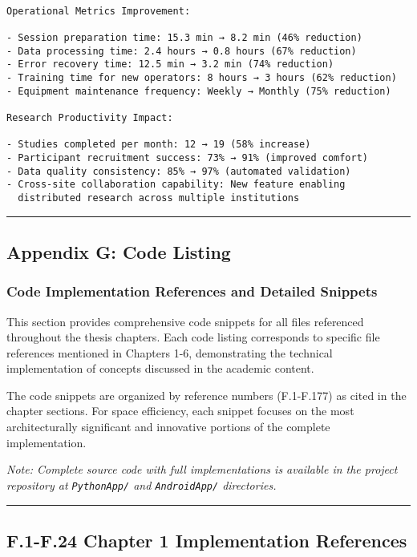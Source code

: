 \documentclass[12pt,a4paper]{article}
\begin{document}
{{\begin{verbatim}

Operational Metrics Improvement:

- Session preparation time: 15.3 min → 8.2 min (46% reduction)
- Data processing time: 2.4 hours → 0.8 hours (67% reduction)
- Error recovery time: 12.5 min → 3.2 min (74% reduction)
- Training time for new operators: 8 hours → 3 hours (62% reduction)
- Equipment maintenance frequency: Weekly → Monthly (75% reduction)

Research Productivity Impact:

- Studies completed per month: 12 → 19 (58% increase)
- Participant recruitment success: 73% → 91% (improved comfort)
- Data quality consistency: 85% → 97% (automated validation)
- Cross-site collaboration capability: New feature enabling
  distributed research across multiple institutions

\end{verbatim}

\hrule

\subsection{Appendix G: Code Listing}

\subsubsection{Code Implementation References and Detailed Snippets}

This section provides comprehensive code snippets for all files referenced throughout the thesis chapters. Each code listing corresponds to specific file references mentioned in Chapters 1-6, demonstrating the technical implementation of concepts discussed in the academic content.

The code snippets are organized by reference numbers (F.1-F.177) as cited in the chapter sections. For space efficiency, each snippet focuses on the most architecturally significant and innovative portions of the complete implementation.

\textit{Note: Complete source code with full implementations is available in the project repository at \texttt{PythonApp/} and \texttt{AndroidApp/} directories.}

\hrule

\subsection{F.1-F.24 Chapter 1 Implementation References}

}}
\end{document}
